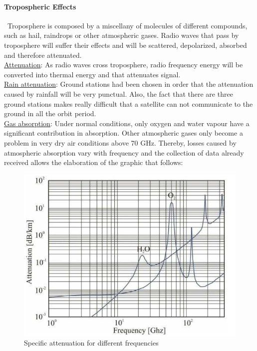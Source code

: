 \paragraph{Tropospheric Effects \cite{Jorge2012}}
\ Troposphere is composed by a miscellany of molecules of different compounds, such as hail, raindrops or other atmospheric gases. Radio waves that pass by troposphere will suffer their effects and will be scattered, depolarized, absorbed and therefore attenuated.\\
\underline{Attenuation}: As radio waves cross troposphere, radio frequency energy will be converted into thermal energy and that attenuates signal.\\
\underline{Rain attenuation}: Ground stations had been chosen in order that the attenuation caused by rainfall will be very punctual. Also, the fact that there are three ground stations makes really difficult that a satellite can not communicate to the ground in all the orbit period.\\
\underline{Gas absorption}: Under normal conditions, only oxygen and water vapour have a significant contribution
in absorption. Other atmospheric gases only become a problem in very dry air
conditions above 70 GHz.
Thereby, losses caused by atmospheric absorption vary with frequency and the
collection of data already received allows the elaboration of the graphic that follows:

\begin{figure}[h]
	\includegraphics[scale=0.7]{./sections/SatelliteDept/sections/images/specificAttenuation}
	\centering
	\caption{Specific attenuation for different frequencies \cite{Jorge2012}}
	\label{specificAtenuattion}
\end{figure}
\\

